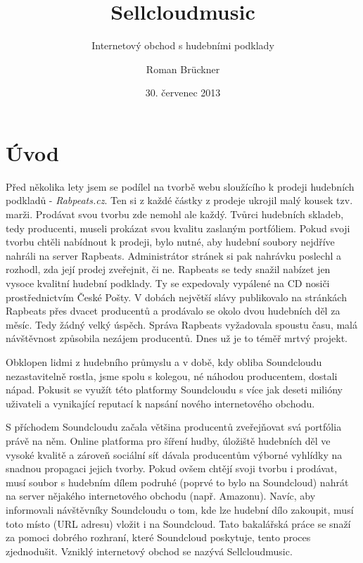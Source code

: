 \documentclass[12pt]{article}
\title{Sellcloudmusic}
\subtitle{Internetový obchod s hudebními podklady}
\author{Roman Brückner}
\date{30. červenec 2013}
\begin{document}
\maketitle
\newpage


\section{Úvod}

Před několika lety jsem se podílel na tvorbě webu sloužícího k prodeji hudebních podkladů - \emph{Rabpeats.cz}. Ten si z každé částky z prodeje ukrojil malý kousek tzv. marži. Prodávat svou tvorbu zde nemohl ale každý. Tvůrci hudebních skladeb, tedy producenti, museli prokázat svou kvalitu zaslaným portfóliem. Pokud svoji tvorbu chtěli nabídnout k prodeji, bylo nutné, aby hudební soubory nejdříve nahráli na server Rapbeats. Administrátor stránek si pak nahrávku poslechl a rozhodl, zda její prodej zveřejnit, či ne. Rapbeats se tedy snažil nabízet jen vysoce kvalitní hudební podklady. Ty se expedovaly vypálené na CD nosiči prostřednictvím České Pošty. V dobách největší slávy publikovalo na stránkách Rapbeats přes dvacet producentů a prodávalo se okolo dvou hudebních děl za měsíc. Tedy žádný velký úspěch. Správa Rapbeats vyžadovala spoustu času, malá návštěvnost způsobila nezájem producentů. Dnes už je to téměř mrtvý projekt.

Obklopen lidmi z hudebního průmyslu a v době, kdy obliba Soundcloudu nezastavitelně rostla, jsme spolu s kolegou, né náhodou producentem, dostali nápad. Pokusit se využít této platformy Soundcloudu s více jak deseti milióny uživateli a vynikající reputací k napsání nového internetového obchodu. 

S příchodem Soundcloudu začala většina producentů zveřejňovat svá portfólia právě na něm. Online platforma pro šíření hudby, úložiště hudebních děl ve vysoké kvalitě a zároveň sociální síť dávala producentům výborné vyhlídky na snadnou propagaci jejich tvorby. Pokud ovšem chtějí svoji tvorbu i prodávat, musí soubor s hudebním dílem podruhé (poprvé to bylo na Soundcloud) nahrát na server nějakého internetového obchodu (např. Amazonu). Navíc, aby informovali návštěvníky Soundcloudu o tom, kde lze hudební dílo zakoupit, musí toto místo (URL adresu) vložit i na Soundcloud. Tato bakalářská práce se snaží za pomoci dobrého rozhraní, které Soundcloud poskytuje, tento proces zjednodušit. Vzniklý internetový obchod se nazývá Sellcloudmusic.\newline
\end{document}
